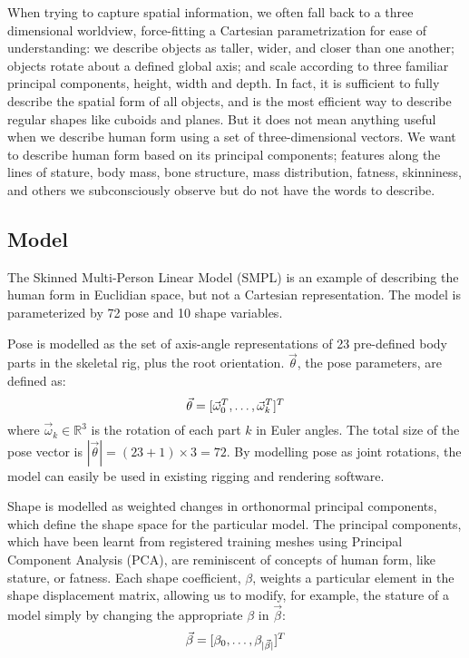 \documentclass[9pt,twocolumn]{article}
\begin{document}
		\par{When trying to capture spatial information, we often fall back to a three dimensional
		worldview, force-fitting a Cartesian parametrization for ease of understanding: we describe
		objects as taller, wider, and closer than one another; objects rotate about a defined global axis;
		and scale according to three familiar principal components, height, width and depth. In fact, it
		is sufficient to fully describe the spatial form of all objects, and is the most efficient
		way to describe regular shapes like cuboids and planes. But it does not mean anything useful 	
		when we describe human form using a set of three-dimensional vectors. We want to describe
		human form based on its principal components; features along the lines of stature, body mass,
		bone structure, mass distribution, fatness, skinniness, and others we subconsciously observe
		but do not have the words to describe.}

	\subsection{Model}

		\par{The Skinned Multi-Person Linear Model (SMPL) is an example of describing the human form
		in Euclidian space, but not a Cartesian representation. The model is parameterized by 72
		pose and 10 shape variables.}\\

		\par{Pose is modelled as the set of axis-angle representations of 23 pre-defined
		body parts in the skeletal rig, plus the root orientation. $\vec{\theta}$, the pose parameters,
		are defined as:
		\begin{equation}
			\vec{\theta} = [\vec{\omega}^{T}_{0}, \mathellipsis, \vec{\omega}^{T}_{k}]^{T}
		\end{equation}
		where $\vec{\omega}_{k} \in \mathbb{R}^{3}$ is the rotation of each part $k$ in Euler angles.
		The total size of the pose vector is $|\vec{\theta}|= {(23+1)}\times{3} = 72$. By modelling
		pose as joint rotations, the model can easily be used in existing rigging and rendering software.}\\

		\par{Shape is modelled as weighted changes in orthonormal principal components, which define the
		shape space for the particular model. The principal components, which have been learnt from registered
		training meshes using Principal Component Analysis (PCA), are reminiscent of concepts of human form,
		like stature, or fatness. Each shape coefficient, $\beta$, weights a particular element in the
		shape displacement matrix, allowing us to modify, for example, the stature of a model simply by
		changing the appropriate $\beta$ in $\vec{\beta}$:
		\begin{equation}
			\vec{\beta} = [\beta_{0}, \mathellipsis, \beta_{|\vec{\beta}|}]^{T}
		\end{equation}
		}
\end{document}
